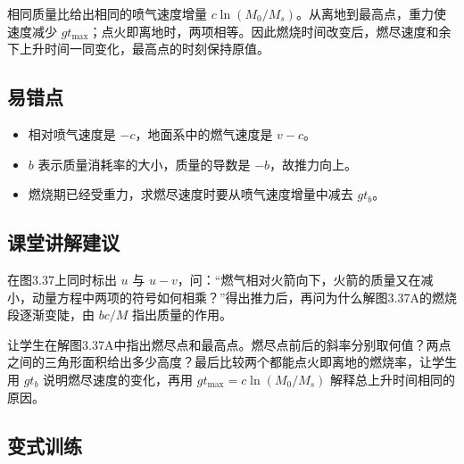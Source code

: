 \documentclass[UTF8,fontset=fandol,a4paper,11pt]{ctexart}
\begin{document}
相同质量比给出相同的喷气速度增量 $c\ln(M_0/M_s)$。从离地到最高点，重力使速度减少 $gt_{\max}$；点火即离地时，两项相等。因此燃烧时间改变后，燃尽速度和余下上升时间一同变化，最高点的时刻保持原值。



\subsection*{易错点}

\begin{itemize}
\item 相对喷气速度是 $-c$，地面系中的燃气速度是 $v-c$。
\item $b$ 表示质量消耗率的大小，质量的导数是 $-b$，故推力向上。
\item 燃烧期已经受重力，求燃尽速度时要从喷气速度增量中减去 $gt_b$。
\end{itemize}



\subsection*{课堂讲解建议}

在图3.37上同时标出 $u$ 与 $u-v$，问：“燃气相对火箭向下，火箭的质量又在减小，动量方程中两项的符号如何相乘？”得出推力后，再问为什么解图3.37A的燃烧段逐渐变陡，由 $bc/M$ 指出质量的作用。

让学生在解图3.37A中指出燃尽点和最高点。燃尽点前后的斜率分别取何值？两点之间的三角形面积给出多少高度？最后比较两个都能点火即离地的燃烧率，让学生用 $gt_b$ 说明燃尽速度的变化，再用 $gt_{\max}=c\ln(M_0/M_s)$ 解释总上升时间相同的原因。



\subsection*{变式训练}
\end{document}
